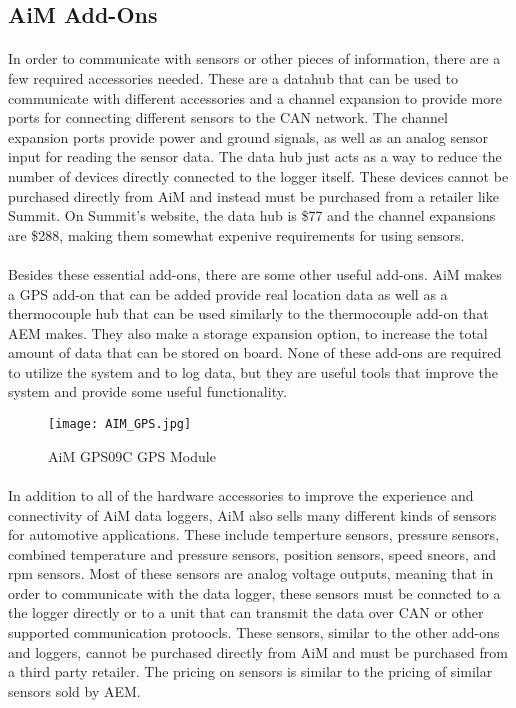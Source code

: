 \subsection{AiM Add-Ons}

\paragraph{}
In order to communicate with sensors or other pieces of information, there are a few required accessories needed.
These are a datahub that can be used to communicate with different accessories and a channel expansion to provide more ports for connecting different sensors to the CAN network.
The channel expansion ports provide power and ground signals, as well as an analog sensor input for reading the sensor data.
The data hub just acts as a way to reduce the number of devices directly connected to the logger itself.
These devices cannot be purchased directly from AiM and instead must be purchased from a retailer like Summit.
On Summit's website, the data hub is \$77 and the channel expansions are \$288, making them somewhat expenive requirements for using sensors.

\paragraph{}
Besides these essential add-ons, there are some other useful add-ons.
AiM makes a GPS add-on that can be added provide real location data as well as a thermocouple hub that can be used similarly to the thermocouple add-on that AEM makes.
They also make a storage expansion option, to increase the total amount of data that can be stored on board.
None of these add-ons are required to utilize the system and to log data, but they are useful tools that improve the system and provide some useful functionality.

\begin{figure}[H]
	\centering
	\texttt{[image: AIM\_GPS.jpg]}
	\caption{AiM GPS09C GPS Module}
	\label{fig:AIM_GPS}
\end{figure}

\paragraph{}
In addition to all of the hardware accessories to improve the experience and connectivity of AiM data loggers, AiM also sells many different kinds of sensors for automotive applications.
These include temperture sensors, pressure sensors, combined temperature and pressure sensors, position sensors, speed sneors, and rpm sensors.
Most of these sensors are analog voltage outputs, meaning that in order to communicate with the data logger, these sensors must be conncted to a the logger directly or to a unit that can transmit the data over CAN or other supported communication protoocls.
These sensors, similar to the other add-ons and loggers, cannot be purchased directly from AiM and must be purchased from a third party retailer.
The pricing on sensors is similar to the pricing of similar sensors sold by AEM.


